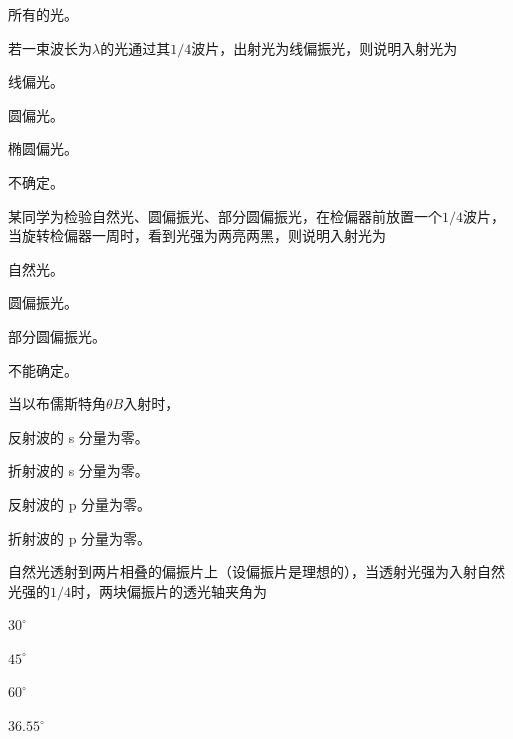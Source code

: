 \documentclass[standard, analysis, notocnum]{ExBook}
\newcommand{\answerarea}[1][8cm]{%
  \par\vspace{2mm}%
  \noindent{\color{themeColor!35}\rule{\linewidth}{0.4pt}}\par
  \noindent\begin{minipage}[t][#1][t]{\linewidth}\vspace{0pt}\end{minipage}\par
  \noindent{\color{themeColor!35}\rule{\linewidth}{0.4pt}}\par
}
\begin{document}
\begin{qitems}
\begin{bbox}
\par\noindent\hspace{2em}所有的光。
\answerarea[3.5cm]
\end{bbox}
\begin{bbox}
\qitem 若一束波长为$\lambda$的光通过其$1/4$波片，出射光为线偏振光，则说明入射光为
\par\noindent\hspace{2em}线偏光。
\par\noindent\hspace{2em}圆偏光。
\par\noindent\hspace{2em}椭圆偏光。
\par\noindent\hspace{2em}不确定。
\answerarea[3.5cm]
\end{bbox}
\begin{bbox}
\qitem 某同学为检验自然光、圆偏振光、部分圆偏振光，在检偏器前放置一个$1/4$波片，当旋转检偏器一周时，看到光强为两亮两黑，则说明入射光为
\par\noindent\hspace{2em}自然光。
\par\noindent\hspace{2em}圆偏振光。
\par\noindent\hspace{2em}部分圆偏振光。
\par\noindent\hspace{2em}不能确定。
\answerarea[3.5cm]
\end{bbox}
\begin{bbox}
\qitem 当以布儒斯特角$\theta B$入射时，
\par\noindent\hspace{2em}反射波的 s 分量为零。
\par\noindent\hspace{2em}折射波的 s 分量为零。
\par\noindent\hspace{2em}反射波的 p 分量为零。
\par\noindent\hspace{2em}折射波的 p 分量为零。
\answerarea[3.5cm]
\end{bbox}
\begin{bbox}
\qitem 自然光透射到两片相叠的偏振片上（设偏振片是理想的），当透射光强为入射自然光强的$1/4$时，两块偏振片的透光轴夹角为
\par\noindent\hspace{2em}$30^{\circ}$
\par\noindent\hspace{2em}$45^{\circ}$
\par\noindent\hspace{2em}$60^{\circ}$
\par\noindent\hspace{2em}$36.55^{\circ}$
\answerarea[3.5cm]
\end{bbox}
\end{qitems}
\end{document}

